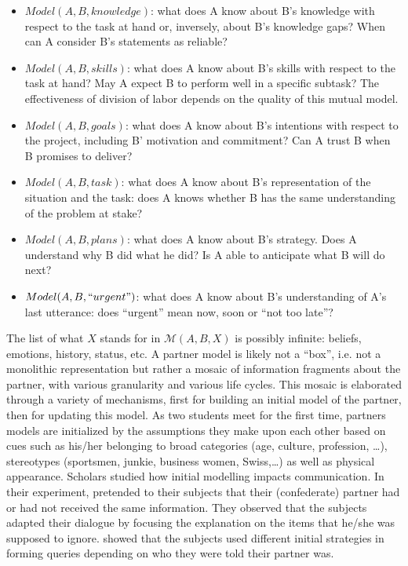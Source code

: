 \documentclass[natbib]{svjour3}
\newcommand{\ie}{i.e.\xspace}
\newcommand{\A}{A\xspace}
\newcommand{\B}{B\xspace}
\newcommand{\model}[3]{{$\mathcal{M}(#1, #2, #3)$}}
\begin{document}
\begin{itemize}

    \item $Model(A,B, knowledge)$: what does \A know about \B's knowledge with
        respect to the task at hand or, inversely, about \B's knowledge gaps?
        When can \A consider \B's statements as reliable? 

    \item $Model(A,B, skills)$: what does \A know about \B's skills with respect to
        the task at hand? May \A expect \B to perform well in a specific subtask?
        The effectiveness of division of labor depends on the quality of this
        mutual model. 

    \item $Model(A,B, goals)$: what does \A know about \B's intentions with respect
        to the project, including \B' motivation and commitment? Can \A trust
        \B
        when \B promises to deliver? 

    \item $Model(A,B, task)$: what does \A know about \B's representation of the
        situation and the task: does \A knows whether \B has the same
        understanding of the problem at stake? 

    \item $Model(A,B, plans)$: what does \A know about \B's strategy. Does A
        understand why \B did what he did? Is \A able to anticipate what \B will do
        next? 

    \item $Model(A,B, ``urgent")$: what does \A know about \B's understanding of \A's
        last utterance: does ``urgent'' mean now, soon or ``not too late''?

\end{itemize}

The list of what $X$ stands for in \model{A}{B}{X} is possibly infinite:
beliefs, emotions, history, status, etc. A partner model is likely not a
``box'', \ie not a monolithic representation but rather a mosaic of information
fragments about the partner, with various granularity and various life cycles.
This mosaic is elaborated through a variety of mechanisms, first for building an
initial model of the partner, then for updating this model. As two students meet
for the first time, partners models are initialized by the assumptions they make
upon each other based on cues such as his/her belonging to broad categories
(age, culture, profession, \ldots), stereotypes (sportsmen, junkie, business
women, Swiss,\ldots) as well as physical appearance. Scholars studied how
initial modelling impacts communication. In their experiment,
\citet{slugoski1993attribution} pretended to their subjects that their
(confederate) partner had or had not received the same information. They
observed that the subjects adapted their dialogue by focusing the explanation on
the items that he/she was supposed to ignore.  \citet{brennan1991conversation}
showed that the subjects used different initial strategies in forming queries
depending on who they were told their partner was.  
\end{document}
